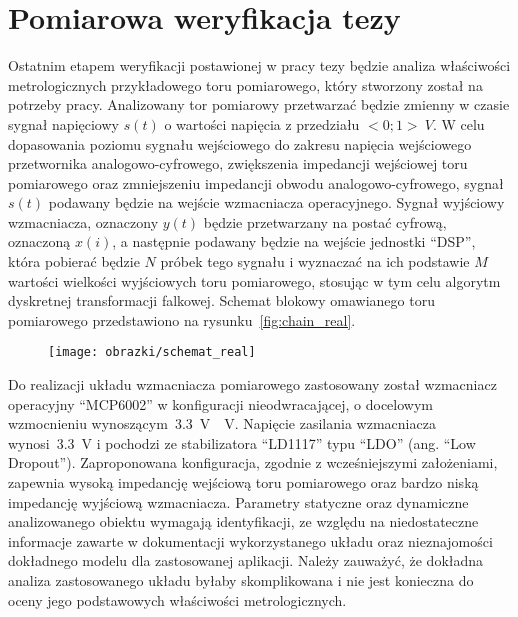 \chapter{Pomiarowa weryfikacja tezy}

Ostatnim etapem weryfikacji postawionej w pracy tezy będzie analiza właściwości metrologicznych przykładowego toru pomiarowego, który stworzony został na potrzeby pracy. Analizowany tor pomiarowy przetwarzać będzie zmienny w czasie sygnał napięciowy $s(t)$ o wartości napięcia z przedziału $<0;1>~\unit{V}$. W celu dopasowania poziomu sygnału wejściowego do zakresu napięcia wejściowego przetwornika analogowo-cyfrowego, zwiększenia impedancji wejściowej toru pomiarowego oraz zmniejszeniu impedancji obwodu analogowo-cyfrowego, sygnał $s(t)$ podawany będzie na wejście wzmacniacza operacyjnego. Sygnał wyjściowy wzmacniacza, oznaczony $y(t)$ będzie przetwarzany na postać cyfrową, oznaczoną $x(i)$, a następnie podawany będzie na wejście jednostki \enquote{DSP}, która pobierać będzie $N$ próbek tego sygnału i wyznaczać na ich podstawie $M$ wartości wielkości wyjściowych toru pomiarowego, stosując w tym celu algorytm dyskretnej transformacji falkowej. Schemat blokowy omawianego toru pomiarowego przedstawiono na rysunku~\ref{fig:chain_real}.

\begin{figure}[htb!]
\begin{center}
\texttt{[image: obrazki/schemat\_real]}
\end{center}
\end{figure}

Do realizacji układu wzmacniacza pomiarowego zastosowany został wzmacniacz operacyjny \enquote{MCP6002} w konfiguracji nieodwracającej, o docelowym wzmocnieniu wynoszącym~\qty{3.3}{V \per V}. Napięcie zasilania wzmacniacza wynosi~\qty{3.3}{V} i pochodzi ze stabilizatora \enquote{LD1117} typu \enquote{LDO} (ang. \enquote{Low Dropout}). Zaproponowana konfiguracja, zgodnie z wcześniejszymi założeniami, zapewnia wysoką impedancję wejściową toru pomiarowego oraz bardzo niską impedancję wyjściową wzmacniacza. Parametry statyczne oraz dynamiczne analizowanego obiektu wymagają identyfikacji, ze względu na niedostateczne informacje zawarte w dokumentacji wykorzystanego układu oraz nieznajomości dokładnego modelu dla zastosowanej aplikacji. Należy zauważyć, że dokładna analiza zastosowanego układu byłaby skomplikowana i nie jest konieczna do oceny jego podstawowych właściwości metrologicznych.

